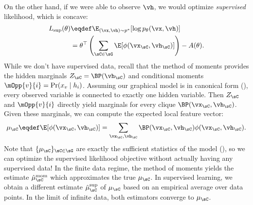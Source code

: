 On the other hand, 
if we were able to observe $\vh$, we would optimize \emph{supervised} likelihood, which is concave:
\begin{align}
\label{eqn:logLinearSupervised}
L_\text{sup}(\theta) &\eqdef \E_{(\vx,\vh) \sim p^*}[\log p_\theta(\vx,\vh)] \\
                     &= \theta^\top \left(\sum_{\sC \in \sG} \E[\phi(\vx_\sC,\vh_\sC)]\right) - A(\theta).
\end{align}
While we don't have supervised data,
recall that the method of moments provides the hidden marginals $Z_\sC = \BP(\vh_\sC)$
and conditional moments $\mOpp{v}{i} = \Pr(x_v \mid h_i)$.
Assuming our graphical model is in canonical form (),
every observed variable is connected to exactly one hidden variable.
Then $Z_\sC$ and $\mOpp{v}{i}$ directly yield marginals for every clique $\BP(\vx_\sC, \vh_\sC)$.
Given these marginals, we can compute the expected local feature vector:
\begin{align}
\label{eqn:logLinearFeatures}
\mu_\sC \eqdef \E[\phi(\vx_\sC,\vh_\sC)] = \sum_{\vx_\sC,\vh_\sC} \BP(\vx_\sC,\vh_\sC) \phi(\vx_\sC,\vh_\sC).
\end{align}
Note that $\{\mu_\sC\}_{\sC \in \sG}$ are exactly the sufficient statistics of the model (),
so we can optimize the supervised likelihood objective without actually having any supervised data!
In the finite data regime, the method of moments yields the estimate
$\hat \mu^\text{mom}_\sC$ which approximates the true $\mu_\sC$.
In supervised learning, we obtain a different estimate $\hat\mu^\text{sup}_\sC$ of $\mu_\sC$ based on an empirical average
over data points.
In the limit of infinite data, both estimators converge to $\mu_\sC$.


